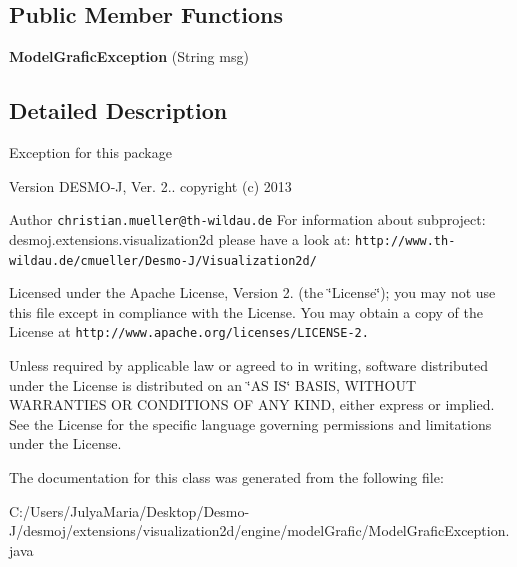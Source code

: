 \subsection*{Public Member Functions}
\begin{DoxyCompactItemize}
\item 
{\bfseries Model\-Grafic\-Exception} (String msg)\label{classdesmoj_1_1extensions_1_1visualization2d_1_1engine_1_1model_grafic_1_1_model_grafic_exception_aa71fd836616da5226bce4be30cc52fcd}

\end{DoxyCompactItemize}


\subsection{Detailed Description}
Exception for this package

\begin{DoxyVersion}{Version}
D\-E\-S\-M\-O-\/\-J, Ver. 2.. copyright (c) 2013 
\end{DoxyVersion}
\begin{DoxyAuthor}{Author}
{\tt christian.\-mueller@th-\/wildau.\-de} For information about subproject\-: desmoj.\-extensions.\-visualization2d please have a look at\-: {\tt http\-://www.\-th-\/wildau.\-de/cmueller/\-Desmo-\/\-J/\-Visualization2d/}
\end{DoxyAuthor}
Licensed under the Apache License, Version 2. (the \char`\"{}\-License\char`\"{}); you may not use this file except in compliance with the License. You may obtain a copy of the License at {\tt http\-://www.\-apache.\-org/licenses/\-L\-I\-C\-E\-N\-S\-E-\/2.}

Unless required by applicable law or agreed to in writing, software distributed under the License is distributed on an \char`\"{}\-A\-S I\-S\char`\"{} B\-A\-S\-I\-S, W\-I\-T\-H\-O\-U\-T W\-A\-R\-R\-A\-N\-T\-I\-E\-S O\-R C\-O\-N\-D\-I\-T\-I\-O\-N\-S O\-F A\-N\-Y K\-I\-N\-D, either express or implied. See the License for the specific language governing permissions and limitations under the License. 

The documentation for this class was generated from the following file\-:\begin{DoxyCompactItemize}
\item 
C\-:/\-Users/\-Julya\-Maria/\-Desktop/\-Desmo-\/\-J/desmoj/extensions/visualization2d/engine/model\-Grafic/Model\-Grafic\-Exception.\-java\end{DoxyCompactItemize}
